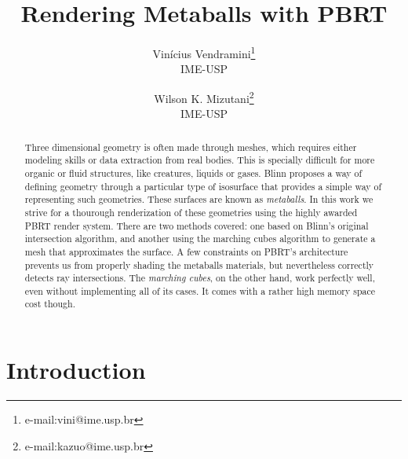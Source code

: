 \documentclass[conference]{acmsiggraph}
\title{Rendering Metaballs with PBRT}
\author{Vinícius Vendramini\thanks{e-mail:vini@ime.usp.br}\\IME-USP \and Wilson K. Mizutani\thanks{e-mail:kazuo@ime.usp.br}\\IME-USP}
\begin{document}

\maketitle

\begin{abstract}

Three dimensional geometry is often made through meshes, which requires
either modeling skills or data extraction from real bodies. This is specially
difficult for more organic or fluid structures, like creatures, liquids or
gases. Blinn  proposes a way of defining
geometry through a particular type of isosurface that provides a simple
way of representing such geometries. These surfaces are known as
\textit{metaballs}. In this work we strive for a thourough renderization of
these geometries using the highly awarded PBRT
 render system. There are two methods covered:
one based on Blinn's original intersection algorithm, and another using the
marching cubes algorithm \cite{Lorensen:1987:MCH:37402.37422} to generate a mesh
that approximates the surface. A few constraints on PBRT's architecture prevents
us from properly shading the metaballs materials, but nevertheless correctly
detects ray intersections. The \textit{marching cubes}, on the other hand, work
perfectly well, even without implementing all of its cases. It comes with a
rather high memory space cost though.

\end{abstract}


\keywordlist


\TOGlinkslist


\copyrightspace

\section{Introduction}
\end{document}
